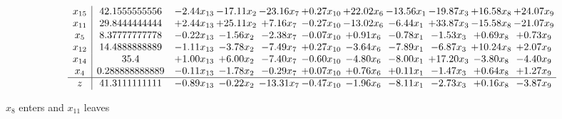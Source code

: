 \documentclass[9pt]{article}
\begin{document}
 \[\begin{array}{c| c c@{\hskip 2pt} c@{\hskip 2pt} c@{\hskip 2pt} c@{\hskip 2pt} c@{\hskip 2pt} c@{\hskip 2pt} c@{\hskip 2pt} c@{\hskip 2pt} c@{\hskip 2pt} }
 x_{15}   &  42.1555555556 & -2.44 x_{13} & -17.11 x_{2} & -23.16 x_{7} & +  0.27 x_{10} & + 22.02 x_{6} & -13.56 x_{1} & -19.87 x_{3} & + 16.58 x_{8} & + 24.07 x_{9}\\
 x_{11}   &  29.8444444444 & +  2.44 x_{13} & + 25.11 x_{2} & +  7.16 x_{7} & -0.27 x_{10} & -13.02 x_{6} & -6.44 x_{1} & + 33.87 x_{3} & -15.58 x_{8} & -21.07 x_{9}\\
 x_{5}   &  8.37777777778 & -0.22 x_{13} & -1.56 x_{2} & -2.38 x_{7} & -0.07 x_{10} & +  0.91 x_{6} & -0.78 x_{1} & -1.53 x_{3} & +  0.69 x_{8} & +  0.73 x_{9}\\
 x_{12}   &  14.4888888889 & -1.11 x_{13} & -3.78 x_{2} & -7.49 x_{7} & +  0.27 x_{10} & -3.64 x_{6} & -7.89 x_{1} & -6.87 x_{3} & + 10.24 x_{8} & +  2.07 x_{9}\\
 x_{14}   &  35.4 & +  1.00 x_{13} & +  6.00 x_{2} & -7.40 x_{7} & -0.60 x_{10} & -4.80 x_{6} & -8.00 x_{1} & + 17.20 x_{3} & -3.80 x_{8} & -4.40 x_{9}\\
 x_{4}   &  0.288888888889 & -0.11 x_{13} & -1.78 x_{2} & -0.29 x_{7} & +  0.07 x_{10} & +  0.76 x_{6} & +  0.11 x_{1} & -1.47 x_{3} & +  0.64 x_{8} & +  1.27 x_{9}\\
\hline
z    &  41.3111111111 & -0.89 x_{13} & -0.22 x_{2} & -13.31 x_{7} & -0.47 x_{10} & -1.96 x_{6} & -8.11 x_{1} & -2.73 x_{3} & +  0.16 x_{8} & -3.87 x_{9}\\
\end{array}\]


 $ x_{8} $ enters and $ x_{11} $ leaves 
\end{document}
